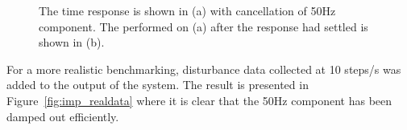 \begin{figure}[h!]
  \centering %
  \qquad
  \caption{\label{fig:rfdc_p_atten} The time response is shown in (a) with cancellation of 50Hz component. The \abbrFFT performed on (a) after the response had settled is shown in (b).}
\end{figure}

For a more realistic benchmarking, disturbance data collected at 10 steps/s was added to the output of the system. The result is presented in Figure~\ref{fig:imp_realdata} where it is clear that the 50Hz component has been damped out efficiently.

